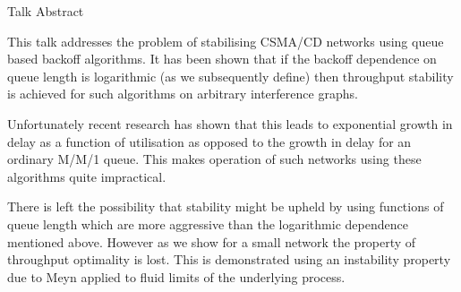 Talk Abstract

This talk addresses the problem of stabilising CSMA/CD networks using
queue based backoff algorithms. It has been shown that if the backoff
dependence on queue length is logarithmic (as we subsequently define)
then throughput stability is achieved for such algorithms on arbitrary interference graphs.

Unfortunately recent research has shown that this leads to exponential growth
in delay as a function of utilisation as opposed to the growth in delay
for an ordinary M/M/1 queue. This makes operation of such networks using
these algorithms quite impractical.

There is left the possibility that stability might be upheld by using
functions of queue length which are more aggressive than the logarithmic
dependence mentioned above. However as we show for a small network the
property of throughput optimality is lost. This is demonstrated using
an instability property due to Meyn applied to fluid limits of the
underlying process.
